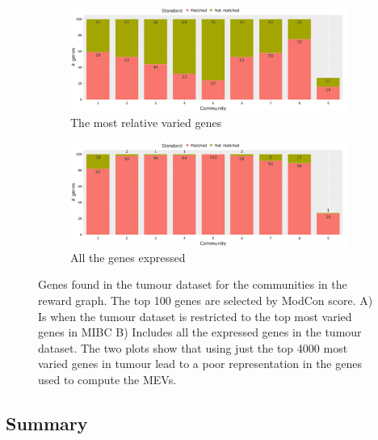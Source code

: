 \begin{figure}[!htb]
    \centering
    \begin{subfigure}[b]{1.0\textwidth}
        \includegraphics[width=\textwidth,keepaspectratio]{Sections/Network_I/Resources/P0/4K_p0_modConMev_rep_norm3_4K_50TF_v3.png}
        \caption{The most relative varied genes}
        \label{fig:N_I:p0_mev_sel_rep}
    \end{subfigure}
    \begin{subfigure}[b]{1.0\textwidth}
        \centering
        \includegraphics[width=\textwidth,keepaspectratio]{Sections/Network_I/Resources/P0/13K_p0_modConMev_rep_norm3_4K_50TF_v3.png}
        \caption{All the genes expressed}
        \label{fig:N_I:p0_mev_all_rep}
    \end{subfigure}
    \caption[Gene representation in MEV]{Genes found in the tumour dataset for the communities in the reward graph. The top 100 genes are selected by ModCon score. A) Is when the tumour dataset is restricted to the top most varied genes in MIBC B) Includes all the expressed genes in the tumour dataset. The two plots show that using just the top 4000 most varied genes in tumour lead to a poor representation in the genes used to compute the MEVs.}
    \label{fig:N_I:p0_mev_rep}
\end{figure}



\subsection{Summary}

